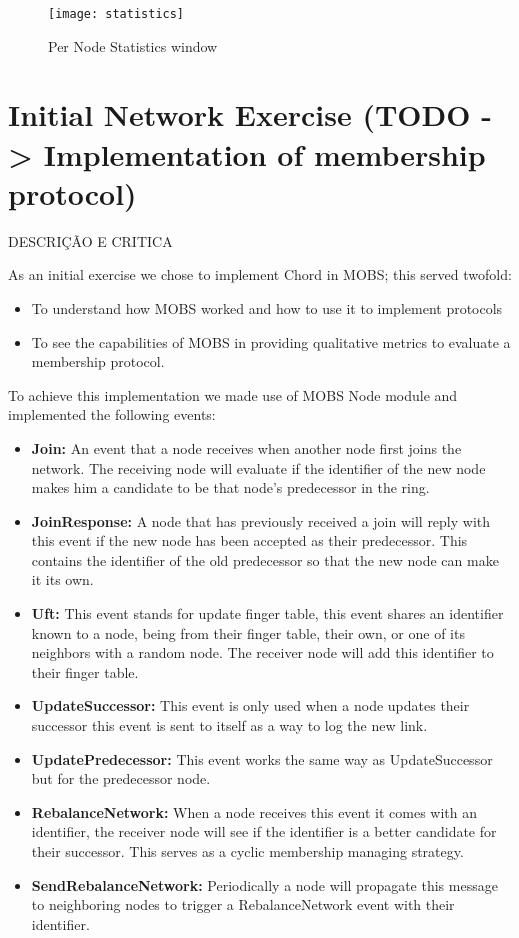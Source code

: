 \begin{figure}[h]
	\centering
	\texttt{[image: statistics]}
	\caption{Per Node Statistics window}
	\label{fig:statistics}
\end{figure}

\section{Initial Network Exercise (TODO -> Implementation of membership protocol)}\label{sub:initial_exercise}
DESCRIÇÃO E CRITICA

As an initial exercise we chose to implement Chord in MOBS; this served twofold:

\begin{itemize}
  \item To understand how MOBS worked and how to use it to implement protocols
  \item To see the capabilities of MOBS in providing qualitative metrics to evaluate
a membership protocol.
\end{itemize}

To achieve this implementation we made use of MOBS Node module and implemented the
following events:

\begin{itemize}
  \item \textbf{Join: } An event that a node receives when another node first joins
the network. The receiving node will evaluate if the identifier of the new node makes him
a candidate to be that node's predecessor in the ring.
  \item \textbf{JoinResponse: } A node that has previously received a join will reply
with this event if the new node has been accepted as their predecessor. This contains
the identifier of the old predecessor so that the new node can make it its own.
  \item \textbf{Uft: } This event stands for update finger table, this event shares
an identifier known to a node, being from their finger table, their own, or one of
its neighbors with a random node. The receiver node will add this identifier to their finger table.
  \item \textbf{UpdateSuccessor: } This event is only used when a node updates their successor
this event is sent to itself as a way to log the new link.
  \item \textbf{UpdatePredecessor: } This event works the same way as UpdateSuccessor
but for the predecessor node.
  \item \textbf{RebalanceNetwork: } When a node receives this event it comes with
an identifier, the receiver node will see if the identifier is a better candidate for
their successor. This serves as a cyclic membership managing strategy.
  \item \textbf{SendRebalanceNetwork: } Periodically a node will propagate this message
to neighboring nodes to trigger a RebalanceNetwork event with their identifier.
\end{itemize}

